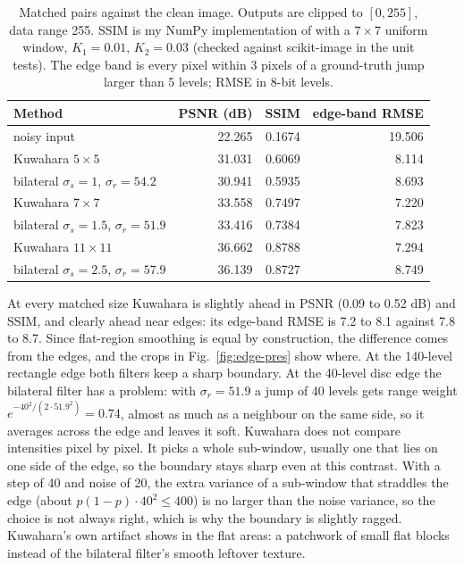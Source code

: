 \begin{table}[H]
\centering
\begin{tabular}{lrrr}
\toprule
Method & PSNR (dB) & SSIM & edge-band RMSE\\
\midrule
noisy input & 22.265 & 0.1674 & 19.506\\
Kuwahara $5\times5$ & 31.031 & 0.6069 & 8.114\\
bilateral $\sigma_s=1$, $\sigma_r=54.2$ & 30.941 & 0.5935 & 8.693\\
Kuwahara $7\times7$ & 33.558 & 0.7497 & 7.220\\
bilateral $\sigma_s=1.5$, $\sigma_r=51.9$ & 33.416 & 0.7384 & 7.823\\
Kuwahara $11\times11$ & 36.662 & 0.8788 & 7.294\\
bilateral $\sigma_s=2.5$, $\sigma_r=57.9$ & 36.139 & 0.8727 & 8.749\\
\bottomrule
\end{tabular}
\caption{Matched pairs against the clean image. Outputs are clipped to
$[0,255]$, data range 255. SSIM is my NumPy implementation of \cite{wang} with a
$7\times7$ uniform window, $K_1=0.01$, $K_2=0.03$ (checked against scikit-image
in the unit tests). The edge band is every pixel within 3 pixels of a
ground-truth jump larger than 5 levels; RMSE in 8-bit levels.}
\label{tab:edge-pres}
\end{table}

At every matched size Kuwahara is slightly ahead in PSNR (0.09 to 0.52 dB) and
SSIM, and clearly ahead near edges: its edge-band RMSE is 7.2 to 8.1 against 7.8
to 8.7. Since flat-region smoothing is equal by construction, the difference
comes from the edges, and the crops in Fig.~\ref{fig:edge-pres} show where. At
the 140-level rectangle edge both filters keep a sharp boundary. At the 40-level
disc edge the bilateral filter has a problem: with $\sigma_r=51.9$ a jump of 40
levels gets range weight $e^{-40^2/(2\cdot51.9^2)}=0.74$, almost as much as a
neighbour on the same side, so it averages across the edge and leaves it soft.
Kuwahara does not compare intensities pixel by pixel. It picks a whole
sub-window, usually one that lies on one side of the edge, so the boundary stays
sharp even at this contrast. With a step of 40 and noise of 20, the extra variance
of a sub-window that straddles the edge (about $p(1-p)\cdot40^2\le400$) is no
larger than the noise variance, so the choice is not always right, which is why
the boundary is slightly ragged. Kuwahara's own artifact shows in the flat areas:
a patchwork of small flat blocks instead of the bilateral filter's smooth
leftover texture.

